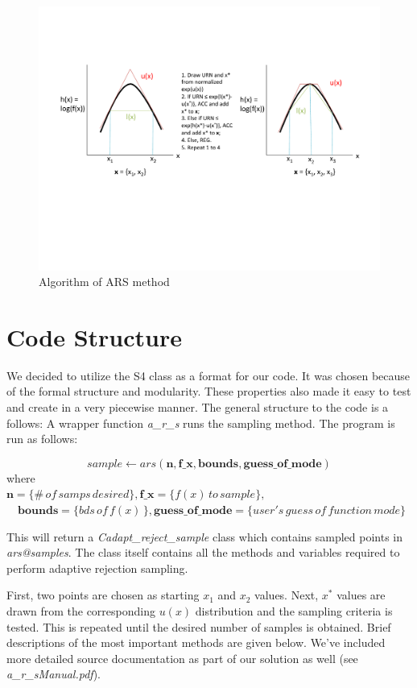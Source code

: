 \documentclass[11pt, oneside]{article}   	%
\begin{document}
\begin{figure}[htbp!]
  \centering
  \caption{ Algorithm of ARS method}
    \includegraphics[width=.93\textwidth]{algorithm}
\end{figure}



\section{Code Structure}

We decided to utilize the S4 class as a format for our code.  It was chosen because of the formal structure and modularity.  These properties also made it easy to test and create in a very piecewise manner.  The general structure to the code is a follows:  A wrapper function \textit{a\_r\_s} runs the sampling method.  The program is run as follows:

 $$sample\gets ars( \mathbf{n}, \mathbf{f\_x}, \mathbf{bounds},\mathbf{guess\_of\_mode}) $$
where\\ 
 $\mathbf{n}=\{\# \, of \, samps \, desired \}, \mathbf{f\_x} = \{f(x) \, to \, sample\}, $\\ $\quad \mathbf{bounds}= \{ bds \, of \, f(x)\, \},   \mathbf{guess\_of\_mode}= \{user's\, guess \,of \,function \, mode\}$
 
 This will return a \textit{Cadapt\_reject\_sample} class which contains sampled points in \textit{ars@samples}.  The class itself contains all the methods and variables required to perform adaptive rejection sampling.  
 
 First, two points are chosen as starting $x_1$ and $x_2$ values.  Next, $x^*$ values are drawn from the corresponding $u(x)$ distribution and the sampling criteria is tested.  This is repeated until the desired number of samples is obtained.    Brief descriptions of the most important methods are given below.  We've included more detailed source documentation as part of our solution as well (see \textit{a\_r\_sManual.pdf}).
\end{document}

